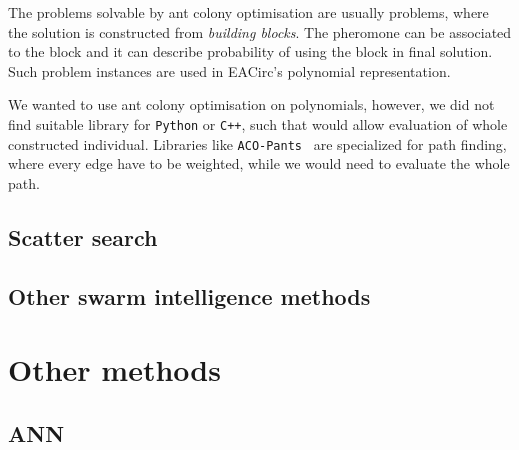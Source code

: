 \documentclass[
  print, %
  Table,   %
  nolof,     %
  nolot,     %
  11pt, %
  oneside  %
]{fithesis3}
\begin{document}
The problems solvable by ant colony optimisation are usually problems, where the solution is constructed from \textit{building blocks}. The pheromone can be associated to the block and it can describe probability of using the block in final solution. Such problem instances are used in EACirc's polynomial representation.

We wanted to use ant colony optimisation on polynomials, however, we did not find suitable library for \texttt{Python} or \texttt{C++}, such that would allow evaluation of whole constructed individual. Libraries like \texttt{ACO-Pants}~\cite{acoPants} are specialized for path finding, where every edge have to be weighted, while we would need to evaluate the whole path.

\subsection{Scatter search}
\label{subsec:opt-multi-sol-scatter}
\subsection{Other swarm intelligence methods}
\label{subsec:opt-multi-sol-si}
\section{Other methods}
\label{sec:opt-other}

% 

\subsection{ANN}
\label{subsec:opt-other-ann}

\end{document}
